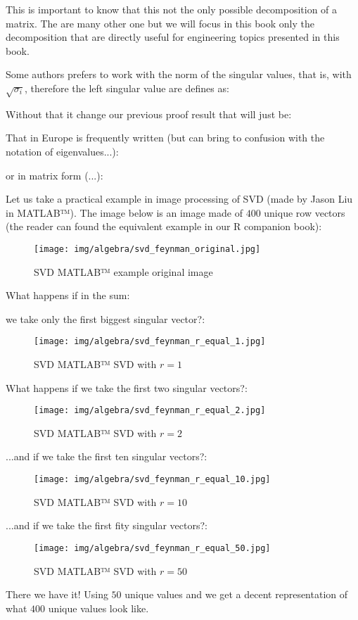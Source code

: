 	This is important to know that this not the only possible decomposition of a matrix. The are many other one but we will focus in this book only the decomposition that are directly useful for engineering topics presented in this book.
	\begin{tcolorbox}[title=Remark,colframe=black,arc=10pt]
	Some authors prefers to work with the norm of the singular values, that is, with $\sqrt{\sigma_i}$, therefore the left singular value are defines as:
	
	Without that it change our previous proof result that will just be:
	
	That in Europe is frequently written (but can bring to confusion with the notation of eigenvalues...):
	
	or in matrix form (...):
	
	\end{tcolorbox}
	Let us take a practical example in image processing of SVD (made by Jason Liu in MATLAB™). The image below is an image made of $400$ unique row vectors (the reader can found the equivalent example in our R companion book):
	\begin{figure}[H]
		\centering
		\texttt{[image: img/algebra/svd\_feynman\_original.jpg]}
		\caption{SVD MATLAB™ example original image}
	\end{figure}
	What happens if in the sum:
	
	we take only the first biggest singular vector?:
	\begin{figure}[H]
		\centering
		\texttt{[image: img/algebra/svd\_feynman\_r\_equal\_1.jpg]}
		\caption[]{SVD MATLAB™ SVD with $r=1$}
	\end{figure}
	What happens if we take the first two singular vectors?:
	\begin{figure}[H]
		\centering
		\texttt{[image: img/algebra/svd\_feynman\_r\_equal\_2.jpg]}
		\caption[]{SVD MATLAB™ SVD with $r=2$}
	\end{figure}
	...and if we take the first ten singular vectors?:
	\begin{figure}[H]
		\centering
		\texttt{[image: img/algebra/svd\_feynman\_r\_equal\_10.jpg]}
		\caption[]{SVD MATLAB™ SVD with $r=10$}
	\end{figure}
	...and if we take the first fity singular vectors?:
	\begin{figure}[H]
		\centering
		\texttt{[image: img/algebra/svd\_feynman\_r\_equal\_50.jpg]}
		\caption[]{SVD MATLAB™ SVD with $r=50$}
	\end{figure}
	There we have it! Using $50$ unique values and we get a decent representation of what $400$ unique values look like.
	
